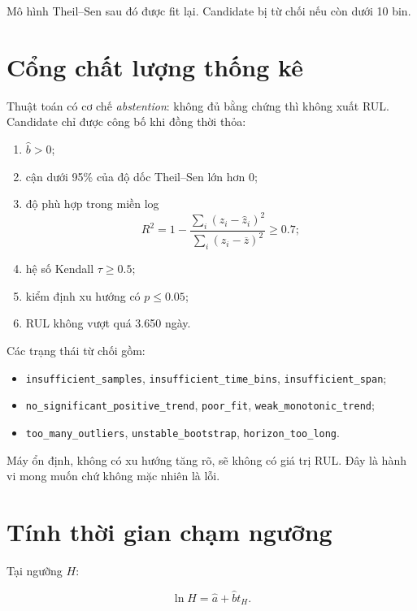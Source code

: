 \documentclass[12pt,a4paper]{article}
\newcommand{\Rtwo}{R^{2}}
\newcommand{\status}[1]{\texttt{#1}}
\begin{document}
Mô hình Theil--Sen sau đó được fit lại. Candidate bị từ chối nếu còn dưới 10 bin.

\section{Cổng chất lượng thống kê}

Thuật toán có cơ chế \emph{abstention}: không đủ bằng chứng thì không xuất RUL. Candidate chỉ được công bố khi đồng thời thỏa:

\begin{enumerate}
  \item $\widehat b>0$;
  \item cận dưới 95\% của độ dốc Theil--Sen lớn hơn 0;
  \item độ phù hợp trong miền log
  \begin{equation}
    \Rtwo=1-
    \frac{\sum_i(z_i-\widehat z_i)^2}
         {\sum_i(z_i-\overline z)^2}
    \ge 0.7;
    \label{eq:r2}
  \end{equation}
  \item hệ số Kendall $\tau\ge0.5$;
  \item kiểm định xu hướng có $p\le0.05$;
  \item RUL không vượt quá 3.650 ngày.
\end{enumerate}

Các trạng thái từ chối gồm:

\begin{itemize}
  \item \status{insufficient\_samples}, \status{insufficient\_time\_bins},
        \status{insufficient\_span};
  \item \status{no\_significant\_positive\_trend}, \status{poor\_fit},
        \status{weak\_monotonic\_trend};
  \item \status{too\_many\_outliers}, \status{unstable\_bootstrap},
        \status{horizon\_too\_long}.
\end{itemize}

Máy ổn định, không có xu hướng tăng rõ, sẽ không có giá trị RUL. Đây là hành vi mong muốn chứ không mặc nhiên là lỗi.

\section{Tính thời gian chạm ngưỡng}

Tại ngưỡng $H$:

\begin{equation}
  \ln H=\widehat a+\widehat b t_H.
\end{equation}
\end{document}
